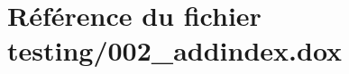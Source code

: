 \hypertarget{002__addindex_8dox}{}\section{Référence du fichier testing/002\+\_\+addindex.dox}
\label{002__addindex_8dox}
